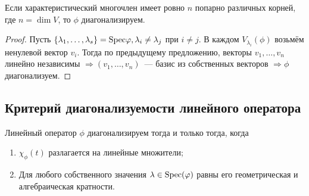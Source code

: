 \begin{Consequence}
  Если характеристический многочлен имеет ровно $n$ попарно различных корней, где $n = \dim V$, то $\phi$ диагонализируем.
\end{Consequence}

\begin{proof}
  Пусть $\{\lambda_1, \ldots, \lambda_s\} = \mathrm{Spec} \varphi, \lambda_i \ne \lambda_j$ при $i \ne j$. В каждом $V_{\lambda_i}(\phi)$ возьмём ненулевой вектор $v_i$. Тогда по предыдущему предложению, векторы $v_1, \ldots, v_n$ линейно независимы $\Rightarrow (v_1, \ldots, v_n)$~--- базис из собственных векторов $\Rightarrow \phi$ диагонализуем.
\end{proof}

\subsection*{Критерий диагонализуемости линейного оператора}
%

\begin{Theorem}
  Линейный оператор $\phi$ диагонализируем тогда и только тогда, когда 
  \begin{enumerate}
  \item $\chi_\phi(t)$ разлагается на линейные множители;
  \item Для любого собственного значения $\lambda \in \mathrm{Spec}(\varphi)$ равны его геометрическая и алгебраическая кратности.
  \end{enumerate}
\end{Theorem}

